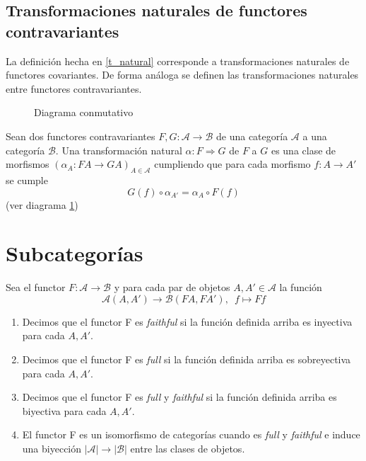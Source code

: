 \subsection{Transformaciones naturales de functores contravariantes}
La definición hecha en \ref{t_natural} corresponde a transformaciones naturales de functores covariantes. De forma análoga se definen las transformaciones naturales entre functores contravariantes. 

\begin{figure}[htpb]
    \centering
    \caption{Diagrama conmutativo}
    \label{diag:trans_natural_contra}
\end{figure}

\begin{definicion}
    Sean dos functores contravariantes $F,G: \mathscr{A} \longrightarrow \mathscr{B}$ de una categoría $\mathscr{A}$ a una categoría $\mathscr{B}$. Una transformación natural $\alpha: F \Rightarrow G$ de $F$ a $G$ es una clase de morfismos $(\alpha_A:FA \longrightarrow GA)_{A\in \mathscr{A}}$ cumpliendo que para cada morfismo $f: A \longrightarrow A'$ se cumple \begin{equation}
        G(f) \circ \alpha_{A'} = \alpha_{A} \circ F(f)
    \end{equation}
    (ver diagrama \ref{diag:trans_natural_contra})
    \label{t_natural}    
\end{definicion}

\section{Subcategorías}

\begin{definicion}
    Sea el functor $F: \mathscr{A} \longrightarrow \mathscr{B}$ y para cada par de objetos $A,A' \in \mathscr{A}$ la función \begin{equation}
        \mathscr{A}(A,A') \longrightarrow \mathscr{B}(FA,FA'), \, \, \, f \mapsto Ff
    \end{equation}
    \begin{enumerate}
        \item Decimos que el functor F es \textit{faithful} si la función definida arriba es inyectiva para cada $A,A'$.
        \item Decimos que el functor F es \textit{full} si la función definida arriba es sobreyectiva para cada $A,A'$.
        \item Decimos que el functor F es \textit{full} y \textit{faithful} si la función definida arriba es biyectiva para cada $A,A'$.
        \item El functor F es un isomorfismo de categorías cuando es \textit{full} y \textit{faithful} e induce una biyección $|\mathscr{A}| \longrightarrow |\mathscr{B}|$ entre las clases de objetos.
    \end{enumerate}
\end{definicion}

